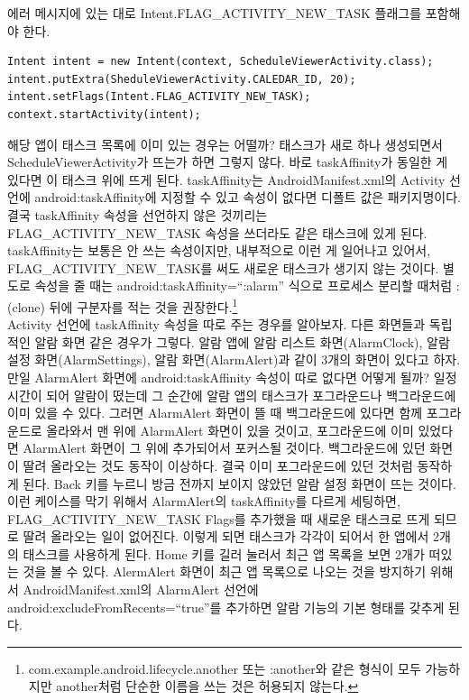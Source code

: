 에러 메시지에 있는 대로 Intent.FLAG\_ACTIVITY\_NEW\_TASK 플래그를 포함해야 한다.
\begin{lstlisting}[frame=single]
Intent intent = new Intent(context, ScheduleViewerActivity.class);
intent.putExtra(SheduleViewerActivity.CALEDAR_ID, 20);
intent.setFlags(Intent.FLAG_ACTIVITY_NEW_TASK);
context.startActivity(intent);
\end{lstlisting}

해당 앱이 태스크 목록에 이미 있는 경우는 어떨까? 태스크가 새로 하나 생성되면서 ScheduleViewerActivity가 뜨는가 하면 그렇지 않다. 바로 taskAffinity가 동일한 게 있다면 이 태스크 위에 뜨게 된다. 
taskAffinity는 AndroidManifest.xml의 Activity 선언에 android:taskAffinity에 지정할 수 있고 속성이 없다면 디폴트 값은 패키지명이다.
결국 taskAffinity 속성을 선언하지 않은 것끼리는 FLAG\_ACTIVITY\_NEW\_TASK 속성을 쓰더라도 같은 태스크에 있게 된다.
taskAffinity는 보통은 안 쓰는 속성이지만, 내부적으로 이런 게 일어나고 있어서, FLAG\_ACTIVITY\_NEW\_TASK를 써도 새로운 태스크가 생기지 않는 것이다.
별도로 속성을 줄 때는 android:taskAffinity=``:alarm'' 식으로 프로세스 분리할 때처럼 :(clone) 뒤에 구분자를 적는 것을 권장한다.\footnote{com.example.android.lifecycle.another 또는 :another와 같은 형식이 모두 가능하지만  another처럼 단순한 이름을 쓰는 것은 허용되지 않는다.}\\

Activity 선언에 taskAffinity 속성을 따로 주는 경우를 알아보자. 다른 화면들과 독립적인 알람 화면 같은 경우가 그렇다. 
알람 앱에 알람 리스트 화면(AlarmClock), 알람 설정 화면(AlarmSettings), 알람 화면(AlarmAlert)과 같이 3개의 화면이 있다고 하자. 
만일 AlarmAlert 화면에 android:taskAffinity 속성이 따로 없다면 어떻게 될까?
일정 시간이 되어 알람이 떴는데 그 순간에 알람 앱의 태스크가 포그라운드나 백그라운드에 이미 있을 수 있다. 
그러면 AlarmAlert 화면이 뜰 때 백그라운드에 있다면 함께 포그라운드로 올라와서 맨 위에 AlarmAlert 화면이 있을 것이고, 포그라운드에 이미 있었다면 AlarmAlert 화면이 그 위에 추가되어서 포커스될 것이다.
백그라운드에 있던 화면이 딸려 올라오는 것도 동작이 이상하다. 결국 이미 포그라운드에 있던 것처럼 동작하게 된다. Back 키를 누르니 방금 전까지 보이지 않았던 알람 설정 화면이 뜨는 것이다.\\

이런 케이스를 막기 위해서 AlarmAlert의 taskAffinity를 다르게 세팅하면, FLAG\_ACTIVITY\_NEW\_TASK Flags를 추가했을 때 새로운 태스크로 뜨게 되므로 딸려 올라오는 일이 없어진다. 이렇게 되면 태스크가 각각이 되어서 한 앱에서 2개의 태스크를 사용하게 된다.
Home 키를 길러 눌러서 최근 앱 목록을 보면 2개가 떠있는 것을 볼 수 있다. AlermAlert 화면이 최근 앱 목록으로 나오는 것을 방지하기 위해서 AndroidManifest.xml의 AlarmAlert 선언에 android:excludeFromRecents=``true''를 추가하면 알람 기능의 기본 형태를 갖추게 된다.


